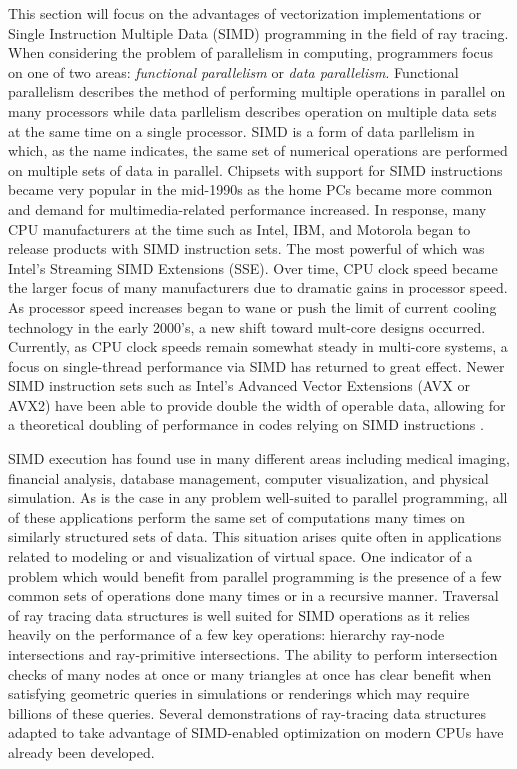 This section will focus on the advantages of vectorization implementations or
Single Instruction Multiple Data (SIMD) programming in the field of ray
tracing. When considering the problem of parallelism in computing, programmers
focus on one of two areas: \textit{functional parallelism} or \textit{data
  parallelism}. Functional parallelism describes the method of performing
multiple operations in parallel on many processors while data parllelism
describes operation on multiple data sets at the same time on a single
processor. SIMD is a form of data parllelism in which, as the name indicates,
the same set of numerical operations are performed on multiple sets of data in
parallel. Chipsets with support for SIMD instructions became very popular in the
mid-1990s as the home PCs became more common and demand for multimedia-related
performance increased. In response, many CPU manufacturers at the time such as
Intel, IBM, and Motorola began to release products with SIMD instruction
sets. The most powerful of which was Intel's Streaming SIMD Extensions
(SSE). Over time, CPU clock speed became the larger focus of many manufacturers
due to dramatic gains in processor speed. As processor speed increases began to
wane or push the limit of current cooling technology in the early 2000's, a new
shift toward mult-core designs occurred. Currently, as CPU clock speeds remain
somewhat steady in multi-core systems, a focus on single-thread performance via
SIMD has returned to great effect. Newer SIMD instruction sets such as Intel's
Advanced Vector Extensions (AVX or AVX2) have been able to provide double the
width of operable data, allowing for a theoretical doubling of performance in codes
relying on SIMD instructions \cite{Hughes_2015}.

SIMD execution has found use in many different areas including medical imaging,
financial analysis, database management, computer visualization, and physical
simulation. As is the case in any problem well-suited to parallel programming,
all of these applications perform the same set of computations many times on
similarly structured sets of data. This situation arises quite often in applications
related to modeling or and visualization of virtual space. One indicator of a
problem which would benefit from parallel programming is the presence of a few
common sets of operations done many times or in a recursive manner. Traversal of
ray tracing data structures is well suited for SIMD operations as it relies
heavily on the performance of a few key operations: hierarchy ray-node
intersections and ray-primitive intersections. The ability to perform intersection
checks of many nodes at once or many triangles at once has clear benefit when
satisfying geometric queries in simulations or renderings which may require
billions of these queries. Several demonstrations of ray-tracing data structures
adapted to take advantage of SIMD-enabled optimization on modern CPUs have
already been developed.

